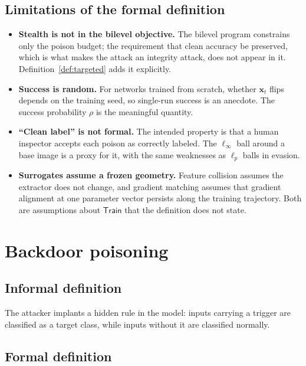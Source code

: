 \documentclass[10pt,a4paper]{extarticle}
\theoremstyle{definition}
\newcommand{\x}{\mathbf{x}}
\newcommand{\Train}{\mathsf{Train}}
\begin{document}
\subsection{Limitations of the formal definition}

\begin{itemize}[leftmargin=1.5em]
  \item \textbf{Stealth is not in the bilevel objective.} The bilevel program constrains only the poison budget; the requirement that clean accuracy be preserved, which is what makes the attack an integrity attack, does not appear in it. Definition~\ref{def:targeted} adds it explicitly.
  \item \textbf{Success is random.} For networks trained from scratch, whether $\x_t$ flips depends on the training seed, so single-run success is an anecdote. The success probability $\rho$ is the meaningful quantity.
  \item \textbf{\enquote{Clean label} is not formal.} The intended property is that a human inspector accepts each poison as correctly labeled. The $\ell_\infty$ ball around a base image is a proxy for it, with the same weaknesses as $\ell_p$ balls in evasion.
  \item \textbf{Surrogates assume a frozen geometry.} Feature collision assumes the extractor does not change, and gradient matching assumes that gradient alignment at one parameter vector persists along the training trajectory. Both are assumptions about $\Train$ that the definition does not state.
\end{itemize}

\section{Backdoor poisoning}\label{sec:backdoor}

\subsection{Informal definition}

The attacker implants a hidden rule in the model: inputs carrying a trigger are classified as a target class, while inputs without it are classified normally.

\subsection{Formal definition}
\end{document}
